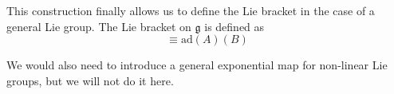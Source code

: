 \documentclass{article}
\begin{document}
    \begin{definition}
      This construction finally allows us to define the Lie bracket in the case of a general Lie group. The Lie bracket on $\mathfrak{g}$ is defined as 
      \begin{equation}
        [A,B] \equiv \text{ad} (A) (B)
      \end{equation}
    \end{definition}

    We would also need to introduce a general exponential map for non-linear Lie groups, but we will not do it here. 
\end{document}
